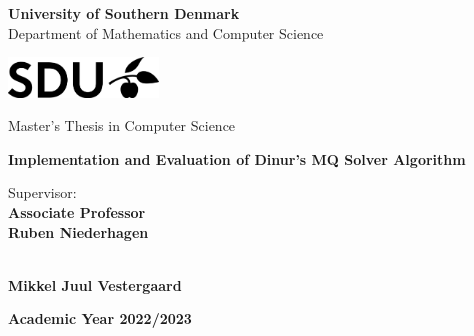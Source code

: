 \begin{titlepage}

    \begin{center}
        {\LARGE \textbf{University of Southern Denmark}} \\
        \vspace{0.2cm}
        {\Large {Department of Mathematics and Computer Science}} \\ 
        \vspace{1cm}

        \includegraphics[width=4cm]{figures/SDU-no-title.png} \\
        \vspace{1cm}

        {\Large {Master's Thesis in Computer Science}} \\
        \vspace{6cm}

        {\LARGE \textbf{Implementation and Evaluation of Dinur's MQ Solver Algorithm}} \\ 
        \vspace{1cm}

    \end{center}

    \begin{multicols}{2}
        \noindent \large{Supervisor:} \\
        \large{\textbf{Associate Professor\\ Ruben Niederhagen}} \\
        \columnbreak

         \\
        \large{\textbf{Mikkel Juul Vestergaard}} \\
    \end{multicols}
    \vspace{4cm}

    \begin{center}
        \large{\textbf{Academic Year 2022/2023}}
    \end{center}

\end{titlepage}

